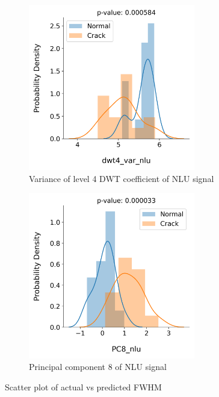 \begin{figure}[tb]
\begin{subfigure}[t]{0.49\linewidth}
    \centering
    \includegraphics[width=0.8\textwidth]{fig/crack_detection_dwt4_var_nlu.png}
    \caption{Variance of level 4 DWT coefficient of NLU signal}
  \end{subfigure}
  \begin{subfigure}[t]{0.49\linewidth}
    \centering
    \includegraphics[width=0.8\textwidth]{fig/crack_detection_PC8_nlu.png}
    \caption{Principal component 8 of NLU signal}
  \end{subfigure}

  \caption{Scatter plot of actual vs predicted FWHM}
  \label{fig: crack detection feat dist}
\end{figure}